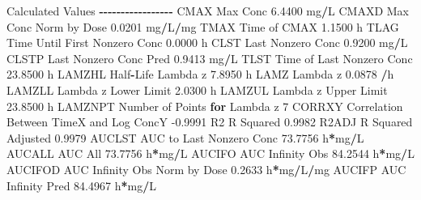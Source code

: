 \documentclass[
  12pt,
]{krantz}
\newenvironment{Shaded}{\begin{snugshade}}{\end{snugshade}}
\newcommand{\ControlFlowTok}[1]{\textcolor[rgb]{0.13,0.29,0.53}{\textbf{#1}}}
\newcommand{\DecValTok}[1]{\textcolor[rgb]{0.00,0.00,0.81}{#1}}
\newcommand{\FloatTok}[1]{\textcolor[rgb]{0.00,0.00,0.81}{#1}}
\newcommand{\NormalTok}[1]{#1}
\newcommand{\OperatorTok}[1]{\textcolor[rgb]{0.81,0.36,0.00}{\textbf{#1}}}
\begin{document}
\begin{Shaded}
\begin{Highlighting}[]
\NormalTok{Calculated Values}
\OperatorTok{{-}{-}{-}{-}{-}{-}{-}{-}{-}{-}{-}{-}{-}{-}{-}{-}{-}}
\NormalTok{CMAX       Max Conc                                        }\FloatTok{6.4400}\NormalTok{ mg}\OperatorTok{/}\NormalTok{L}
\NormalTok{CMAXD      Max Conc Norm by Dose                           }\FloatTok{0.0201}\NormalTok{ mg}\OperatorTok{/}\NormalTok{L}\OperatorTok{/}\NormalTok{mg}
\NormalTok{TMAX       Time of CMAX                                    }\FloatTok{1.1500}\NormalTok{ h}
\NormalTok{TLAG       Time Until First Nonzero Conc                   }\FloatTok{0.0000}\NormalTok{ h}
\NormalTok{CLST       Last Nonzero Conc                               }\FloatTok{0.9200}\NormalTok{ mg}\OperatorTok{/}\NormalTok{L}
\NormalTok{CLSTP      Last Nonzero Conc Pred                          }\FloatTok{0.9413}\NormalTok{ mg}\OperatorTok{/}\NormalTok{L}
\NormalTok{TLST       Time of Last Nonzero Conc                      }\FloatTok{23.8500}\NormalTok{ h}
\NormalTok{LAMZHL     Half}\OperatorTok{{-}}\NormalTok{Life Lambda z                              }\FloatTok{7.8950}\NormalTok{ h}
\NormalTok{LAMZ       Lambda z                                        }\FloatTok{0.0878} \OperatorTok{/}\NormalTok{h}
\NormalTok{LAMZLL     Lambda z Lower Limit                            }\FloatTok{2.0300}\NormalTok{ h}
\NormalTok{LAMZUL     Lambda z Upper Limit                           }\FloatTok{23.8500}\NormalTok{ h}
\NormalTok{LAMZNPT    Number of Points }\ControlFlowTok{for}\NormalTok{ Lambda z                   }\DecValTok{7}
\NormalTok{CORRXY     Correlation Between TimeX and Log ConcY        }\FloatTok{{-}0.9991} 
\NormalTok{R2         R Squared                                       }\FloatTok{0.9982} 
\NormalTok{R2ADJ      R Squared Adjusted                              }\FloatTok{0.9979} 
\NormalTok{AUCLST     AUC to Last Nonzero Conc                       }\FloatTok{73.7756}\NormalTok{ h}\OperatorTok{*}\NormalTok{mg}\OperatorTok{/}\NormalTok{L}
\NormalTok{AUCALL     AUC All                                        }\FloatTok{73.7756}\NormalTok{ h}\OperatorTok{*}\NormalTok{mg}\OperatorTok{/}\NormalTok{L}
\NormalTok{AUCIFO     AUC Infinity Obs                               }\FloatTok{84.2544}\NormalTok{ h}\OperatorTok{*}\NormalTok{mg}\OperatorTok{/}\NormalTok{L}
\NormalTok{AUCIFOD    AUC Infinity Obs Norm by Dose                   }\FloatTok{0.2633}\NormalTok{ h}\OperatorTok{*}\NormalTok{mg}\OperatorTok{/}\NormalTok{L}\OperatorTok{/}\NormalTok{mg}
\NormalTok{AUCIFP     AUC Infinity Pred                              }\FloatTok{84.4967}\NormalTok{ h}\OperatorTok{*}\NormalTok{mg}\OperatorTok{/}\NormalTok{L}

\end{Highlighting}
\end{Shaded}
\end{document}
